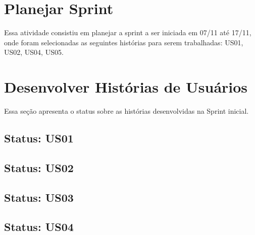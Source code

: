 \section{Planejar Sprint}
Essa atividade consistiu em planejar a sprint a ser iniciada em 07/11 até 17/11, onde foram selecionadas as seguintes histórias para serem trabalhadas: US01, US02, US04, US05.

\section{Desenvolver Histórias de Usuários}
Essa seção apresenta o status sobre as histórias desenvolvidas na Sprint inicial.

\subsection{Status: US01}

\subsection{Status: US02}

\subsection{Status: US03}

\subsection{Status: US04}
